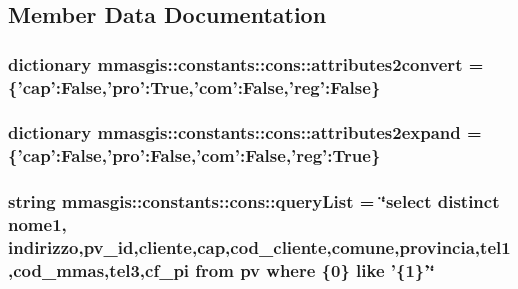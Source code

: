 \subsection{Member Data Documentation}
\hypertarget{classmmasgis_1_1constants_1_1cons_ac2269c69153d85632883d0b6aabf7172}{
\subsubsection[{attributes2convert}]{\setlength{\rightskip}{0pt plus 5cm}dictionary {\bf mmasgis::constants::cons::attributes2convert} = \{'cap':False,'pro':True,'com':False,'reg':False\}}}
\label{classmmasgis_1_1constants_1_1cons_ac2269c69153d85632883d0b6aabf7172}
\hypertarget{classmmasgis_1_1constants_1_1cons_ac4dacd4136abd39f4f3ec13284fc910d}{
\subsubsection[{attributes2expand}]{\setlength{\rightskip}{0pt plus 5cm}dictionary {\bf mmasgis::constants::cons::attributes2expand} = \{'cap':False,'pro':False,'com':False,'reg':True\}}}
\label{classmmasgis_1_1constants_1_1cons_ac4dacd4136abd39f4f3ec13284fc910d}
\hypertarget{classmmasgis_1_1constants_1_1cons_a2872aa9e988b45cdff7256e403e0bfd0}{
\subsubsection[{queryList}]{\setlength{\rightskip}{0pt plus 5cm}string {\bf mmasgis::constants::cons::queryList} = \char`\"{}select distinct nome1, indirizzo,pv\_\-id,cliente,cap,cod\_\-cliente,comune,provincia,tel1,cod\_\-mmas,tel3,cf\_\-pi from pv where \{0\} like '\{1\}'\char`\"{}}}
\label{classmmasgis_1_1constants_1_1cons_a2872aa9e988b45cdff7256e403e0bfd0}

